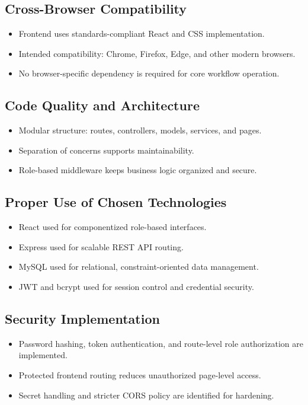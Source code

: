 \documentclass[12pt,a4paper]{article}
\begin{document}
\subsection{Cross-Browser Compatibility}
\begin{itemize}[leftmargin=1.2cm]
    \item Frontend uses standards-compliant React and CSS implementation.
    \item Intended compatibility: Chrome, Firefox, Edge, and other modern browsers.
    \item No browser-specific dependency is required for core workflow operation.
\end{itemize}

\subsection{Code Quality and Architecture}
\begin{itemize}[leftmargin=1.2cm]
    \item Modular structure: routes, controllers, models, services, and pages.
    \item Separation of concerns supports maintainability.
    \item Role-based middleware keeps business logic organized and secure.
\end{itemize}

\subsection{Proper Use of Chosen Technologies}
\begin{itemize}[leftmargin=1.2cm]
    \item React used for componentized role-based interfaces.
    \item Express used for scalable REST API routing.
    \item MySQL used for relational, constraint-oriented data management.
    \item JWT and bcrypt used for session control and credential security.
\end{itemize}

\subsection{Security Implementation}
\begin{itemize}[leftmargin=1.2cm]
    \item Password hashing, token authentication, and route-level role authorization are implemented.
    \item Protected frontend routing reduces unauthorized page-level access.
    \item Secret handling and stricter CORS policy are identified for hardening.
\end{itemize}
\end{document}
